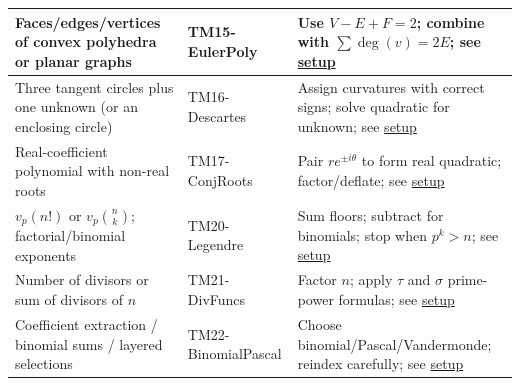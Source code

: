\documentclass{article}
\begin{document}
\begin{center}
\begin{longtable}{|>{\raggedright\arraybackslash}m{}|>{\raggedright\arraybackslash}p{}|>{\raggedright\arraybackslash}p{}|}
\hline
Faces/edges/vertices of convex polyhedra or planar graphs & TM15-EulerPoly & Use $V{-}E{+}F=2$; combine with $\sum \deg(v)=2E$; see \hyperlink{technique-setup}{setup} \\
\hline
Three tangent circles plus one unknown (or an enclosing circle) & TM16-Descartes & Assign curvatures with correct signs; solve quadratic for unknown; see \hyperlink{technique-setup}{setup} \\
\hline
Real-coefficient polynomial with non-real roots & TM17-ConjRoots & Pair $re^{\pm i\theta}$ to form real quadratic; factor/deflate; see \hyperlink{technique-setup}{setup} \\
\hline
\hline
\hline
$v_p(n!)$ or $v_p\binom{n}{k}$; factorial/binomial exponents & TM20-Legendre & Sum floors; subtract for binomials; stop when $p^k>n$; see \hyperlink{technique-setup}{setup} \\
\hline
Number of divisors or sum of divisors of $n$ & TM21-DivFuncs & Factor $n$; apply $\tau$ and $\sigma$ prime-power formulas; see \hyperlink{technique-setup}{setup} \\
\hline
Coefficient extraction / binomial sums / layered selections & TM22-BinomialPascal & Choose binomial/Pascal/Vandermonde; reindex carefully; see \hyperlink{technique-setup}{setup} \\
\hline
\hline
\end{longtable}
\end{center}
\end{document}

